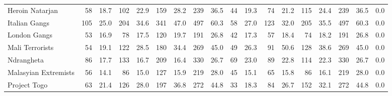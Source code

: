 \begin{tabular}{lrrrrrrrrrrrrrrrrl}
Heroin Natarjan      &                58 &  18.7 &  102 &  22.9 &  159 &  28.2 &  239 &  36.5 &               44 &   19.3 &   74 &   21.2 &  115 &   24.4 &  239 &  36.5 &        0.0 \\
Italian Gangs        &               105 &  25.0 &  204 &  34.6 &  341 &  47.0 &  497 &  60.3 &               58 &   27.0 &  123 &   32.0 &  205 &   35.5 &  497 &  60.3 &        0.0 \\
London Gangs         &                53 &  16.9 &   78 &  17.5 &  120 &  19.7 &  191 &  26.8 &               42 &   17.3 &   57 &   18.4 &   74 &   18.2 &  191 &  26.8 &        0.0 \\
Mali Terrorists      &                54 &  19.1 &  122 &  28.5 &  180 &  34.4 &  269 &  45.0 &               49 &   26.3 &   91 &   50.6 &  128 &   38.6 &  269 &  45.0 &        0.0 \\
Ndrangheta           &                86 &  17.7 &  133 &  16.7 &  209 &  16.4 &  330 &  26.7 &               69 &   23.0 &   89 &   22.8 &  114 &   22.3 &  330 &  26.7 &        0.0 \\
Malasyian Extremists &                56 &  14.1 &   86 &  15.0 &  127 &  15.9 &  219 &  28.0 &               45 &   15.1 &   65 &   15.8 &   86 &   16.1 &  219 &  28.0 &        0.0 \\
Project Togo         &                63 &  21.4 &  126 &  28.0 &  197 &  36.8 &  272 &  44.8 &               33 &   18.3 &   84 &   26.7 &  152 &   32.1 &  272 &  44.8 &        0.0 \\
\bottomrule
\end{tabular}
